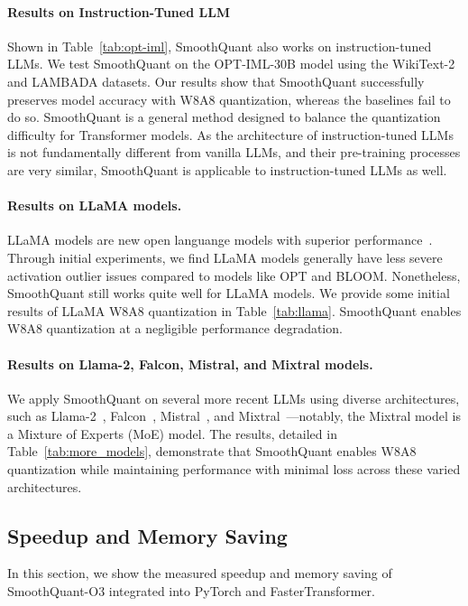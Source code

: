\paragraph{Results on Instruction-Tuned LLM}

Shown in Table~\ref{tab:opt-iml}, SmoothQuant also works on instruction-tuned LLMs. We test SmoothQuant on the OPT-IML-30B model using the WikiText-2 and LAMBADA datasets. Our results show that SmoothQuant successfully preserves model accuracy with W8A8 quantization, whereas the baselines fail to do so. SmoothQuant is a general method designed to balance the quantization difficulty for Transformer models. As the architecture of instruction-tuned LLMs is not fundamentally different from vanilla LLMs, and their pre-training processes are very similar, SmoothQuant is applicable to instruction-tuned LLMs as well.

\paragraph{Results on LLaMA models.}

LLaMA models are new open languange models with superior performance~\cite{touvron2023llama}. Through initial experiments, we find LLaMA models generally have less severe activation outlier issues compared to models like OPT and BLOOM. Nonetheless, SmoothQuant still works quite well for LLaMA models. We provide some initial results of LLaMA W8A8 quantization in Table~\ref{tab:llama}. SmoothQuant enables W8A8 quantization at a negligible performance degradation. 

\paragraph{Results on Llama-2, Falcon, Mistral, and Mixtral models.}

We apply SmoothQuant on several more recent LLMs using diverse architectures, such as Llama-2~\cite{touvron2023llama2}, Falcon~\cite{almazrouei2023falcon}, Mistral~\cite{jiang2023mistral}, and Mixtral~\cite{jiang2024mixtral}—notably, the Mixtral model is a Mixture of Experts (MoE) model. The results, detailed in Table~\ref{tab:more_models}, demonstrate that SmoothQuant enables W8A8 quantization while maintaining performance with minimal loss across these varied architectures.

\subsection{Speedup and Memory Saving} In this section, we show the measured speedup and memory saving of SmoothQuant-O3 integrated into PyTorch and FasterTransformer.
